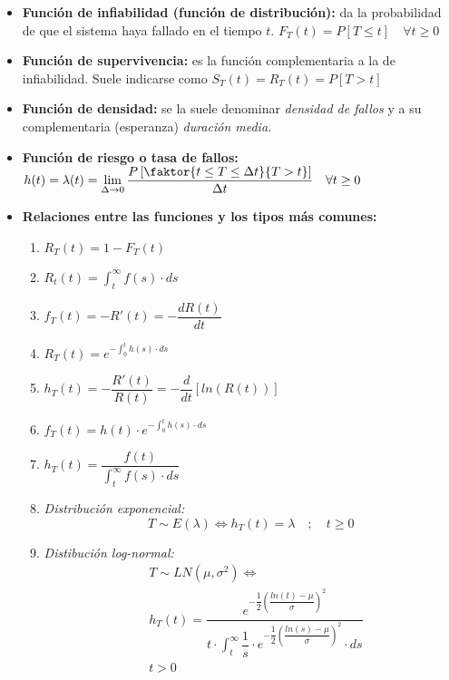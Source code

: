 \documentclass[a4paper, twocolumn, 10pt]{article}
\begin{document}
\begin{itemize}
	\item \textbf{Función de infiabilidad (función de distribución):} da la probabilidad de que el sistema haya fallado en el tiempo $t$. $F_T(t) = P\left[T\leq t\right] \quad \forall t\ge 0$
	\item \textbf{Función de supervivencia:} es la función complementaria a la de infiabilidad. Suele indicarse como $S_T(t) = R_T(t) = P\left[T > t \right]$
	\item \textbf{Función de densidad:} se la suele denominar \textit{densidad de fallos} y a su complementaria (esperanza) \textit{duración media.}
	\item \textbf{Función de riesgo o tasa de fallos:} $h(t) = \lambda(t) = \lim\limits_{\Delta\rightarrow0}\dfrac{P\left[\faktor{t\leq T \leq \Delta t}{T>t}\right]}{\Delta t} \quad \forall t\ge 0$
	\item \textbf{Relaciones entre las funciones y los tipos más comunes:}
	\begin{enumerate}
		\item $R_T(t) = 1 - F_T(t)$
		\item $R_t(t) = \displaystyle \int_{t}^{\infty}f(s)\cdot ds$
		\item $f_T(t) = -R'(t) = -\dfrac{dR(t)}{dt}$
		\item $R_T(t) = e^{\displaystyle -\int_{0}^{t}h(s)\cdot ds}$
		\item $h_T(t) = -\dfrac{R'(t)}{R(t)} = -\dfrac{d}{dt}\left[ln(R(t))\right]$
		\item $f_T(t) = h(t)\cdot e^{\displaystyle -\int_{0}^{t}h(s)\cdot ds}$
		\item $h_T(t) = \dfrac{f(t)}{\displaystyle \int_{t}^{\infty}f(s)\cdot ds}$
		\item \textit{Distribución exponencial:}
		\begin{equation*}
			T\sim E(\lambda) \Leftrightarrow h_T(t) = \lambda \quad ;\quad t\ge 0
		\end{equation*}
		\item \textit{Distibución log-normal:}
		\begin{eqnarray*}
			&T\sim LN(\mu, \sigma^2) \Leftrightarrow \\ &h_T(t) = \dfrac{e^{ -\dfrac{1}{2}\left(\dfrac{ln(t)-\mu}{\sigma}\right)^2}}{t\cdot \displaystyle \int_{t}^{\infty}\dfrac{1}{s}\cdot e^{-\dfrac{1}{2}\left(\dfrac{ln(s)-\mu}{\sigma}\right)^2}\cdot ds} \\ & t>0
		\end{eqnarray*}
	\end{enumerate}
\end{itemize}
\end{document}
